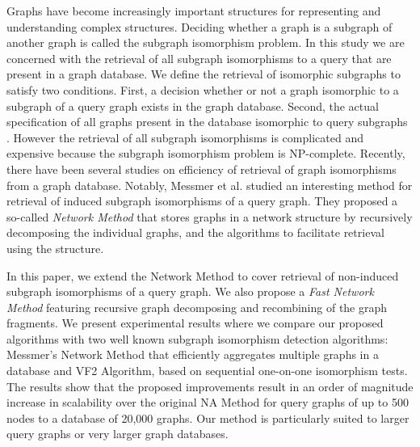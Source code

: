 Graphs have become increasingly important structures for representing and understanding complex structures.
Deciding whether a graph is a subgraph of another graph is called the subgraph isomorphism problem. 
In this study we are concerned with the retrieval of all subgraph isomorphisms to a query that are present in a graph database.
We define the retrieval of isomorphic subgraphs to satisfy two conditions. 
 First, a decision whether or not a graph isomorphic to a subgraph of a query graph exists in the graph database.
Second, the actual specification of all graphs present in the database isomorphic to query subgraphs . 
However the retrieval of all subgraph isomorphisms is complicated and expensive because the subgraph isomorphism problem is NP-complete.
Recently, there have been several studies on efficiency of retrieval of graph isomorphisms from a graph database.
Notably, Messmer et al. studied an interesting method for retrieval of induced subgraph isomorphisms of a query graph.
They proposed a so-called \textit{Network Method} that stores graphs  in a network structure  by recursively decomposing the individual graphs, and the algorithms to facilitate retrieval using the structure.

In this paper, we extend the Network Method to cover retrieval of non-induced subgraph isomorphisms of a query graph. We also propose a  \textit{ Fast  Network Method} featuring recursive graph decomposing and recombining of the graph fragments. 
We present experimental results where we compare our proposed algorithms with two well known subgraph isomorphism detection algorithms: Messmer's Network Method that efficiently aggregates multiple graphs in a database
 and VF2 Algorithm, based on sequential one-on-one isomorphism tests. 
The results show that the proposed improvements result in an order of magnitude increase in scalability over the original  NA Method  for query graphs of up to 500 nodes to a database of 20,000 graphs.  
Our method is particularly suited to larger query graphs or very larger graph databases.


